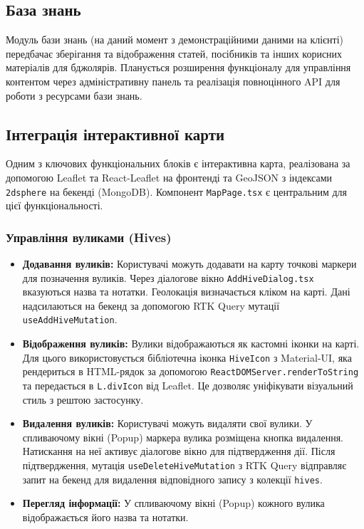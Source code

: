 \subsection{База знань}
Модуль бази знань (на даний момент з демонстраційними даними на клієнті) передбачає зберігання та відображення статей, посібників та інших корисних матеріалів для бджолярів. Планується розширення функціоналу для управління контентом через адміністративну панель та реалізація повноцінного API для роботи з ресурсами бази знань.

\subsection{Інтеграція інтерактивної карти}
Одним з ключових функціональних блоків є інтерактивна карта, реалізована за допомогою Leaflet та React-Leaflet на фронтенді та GeoJSON з індексами \texttt{2dsphere} на бекенді (MongoDB). Компонент \texttt{MapPage.tsx} є центральним для цієї функціональності.

\subsubsection{Управління вуликами (Hives)}
\begin{itemize}
    \item \textbf{Додавання вуликів:} Користувачі можуть додавати на карту точкові маркери для позначення вуликів. Через діалогове вікно \texttt{AddHiveDialog.tsx} вказуються назва та нотатки. Геолокація визначається кліком на карті. Дані надсилаються на бекенд за допомогою RTK Query мутації \texttt{useAddHiveMutation}.
    \item \textbf{Відображення вуликів:} Вулики відображаються як кастомні іконки на карті. Для цього використовується бібліотечна іконка \texttt{HiveIcon} з Material-UI, яка рендериться в HTML-рядок за допомогою \texttt{ReactDOMServer.renderToString} та передається в \texttt{L.divIcon} від Leaflet. Це дозволяє уніфікувати візуальний стиль з рештою застосунку.
    \item \textbf{Видалення вуликів:} Користувачі можуть видаляти свої вулики. У спливаючому вікні (Popup) маркера вулика розміщена кнопка видалення. Натискання на неї активує діалогове вікно для підтвердження дії. Після підтвердження, мутація \texttt{useDeleteHiveMutation} з RTK Query відправляє запит на бекенд для видалення відповідного запису з колекції \texttt{hives}.
    \item \textbf{Перегляд інформації:} У спливаючому вікні (Popup) кожного вулика відображається його назва та нотатки.
\end{itemize}

